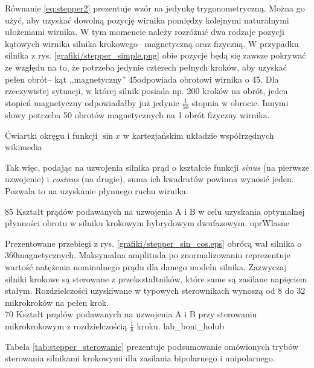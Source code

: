 Równanie \ref{eq:stepper2} prezentuje wzór na jedynkę trygonometryczną. Można go użyć, aby uzyskać dowolną pozycję wirnika pomiędzy kolejnymi naturalnymi ułożeniami wirnika. W tym momencie należy rozróżnić dwa rodzaje pozycji kątowych wirnika silnika krokowego-- magnetyczną oraz fizyczną. W przypadku silnika z rys. \ref{grafiki/stepper_simple.png} obie pozycje będą się zawsze pokrywać ze względu na to, że potrzeba jedynie czterech pełnych kroków, aby uzyskać pełen obrót-- kąt ,,magnetyczny'' 45\degree odpowiada obrotowi wirnika o 45\degree. Dla rzeczywistej sytuacji, w której silnik posiada np. 200 kroków na obrót, jeden stopień magnetyczny odpowiadałby już jedynie $ \frac{1}{50} $ stopnia w obrocie. Innymi słowy potrzeba 50 obrotów magnetycznych na 1 obrót fizyczny wirnika.

		{Ćwiartki okręgu i funkcji $ \sin x $ w kartezjańskim układzie współrzędnych}
		{wikimedia}
		
Tak więc, podając na uzwojenia silnika prąd o kształcie funkcji {\it sinus} (na pierwsze uzwojenie) i {\it cosinus} (na drugie), suma ich kwadratów powinna wynosić jeden. Pozwala to na uzyskanie płynnego ruchu wirnika.

		{85}
		{Kształt prądów podawanych na uzwojenia A i B w celu uzyskania optymalnej płynności obrotu w silniku krokowym hybrydowym dwufazowym.}
		{oprWlasne}
		
Prezentowane przebiegi z rys. \ref{grafiki/stepper_sin_cos.eps} obrócą wał silnika o 360\degree magnetycznych. Maksymalna amplituda po znormalizowaniu reprezentuje wartość natężenia nominalnego prądu dla danego modelu silnika. Zazwyczaj silniki krokowe są sterowane z przekształtników, które same są zasilane napięciem stałym. Rozdzielczości uzyskiwane w typowych sterownikach wynoszą od 8 do 32 mikrokroków na pełen krok.  \\

		{70}
		{Kształt prądów podawanych na uzwojenia A i B przy sterowaniu mikrokrokowym z rozdzielczością $ \frac{1}{8} $ kroku.}
		{lab_boni_holub}
		
Tabela \ref{tab:stepper_sterowanie} prezentuje podsumowanie omówionych trybów sterowania silnikami krokowymi dla zasilania bipolarnego i unipolarnego.

